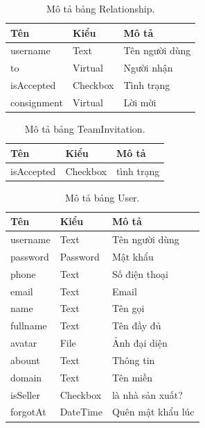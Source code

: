 \documentclass[11pt]{report}
\begin{document}
	
	\begin{table}[h!]
		\begin{center}
			\caption{Mô tả bảng Relationship.}
			\begin{tabularx}{0.6\textwidth}{ |l|l|X| } 
				\hline
				Tên & Kiểu & Mô tả \\
				\hline
				username & Text & Tên người dùng \\
				to & Virtual & Người nhận \\
				isAccepted & Checkbox & Tình trạng \\
				consignment & Virtual & Lời mời \\ 
				\hline
			\end{tabularx}
			\label{table:Relationship}
		\end{center}
	\end{table}
	
	
	\begin{table}[h!]
		\begin{center}
			\caption{Mô tả bảng TeamInvitation.}
			\begin{tabularx}{0.6\textwidth}{ |l|l|X| } 
				\hline
				Tên & Kiểu & Mô tả \\
				\hline
				isAccepted & Checkbox & tình trạng \\
				\hline
			\end{tabularx}
			\label{table:TeamInvitation}
		\end{center}
	\end{table}
	
	\begin{table}[h!]
		\begin{center}
			\caption{Mô tả bảng User.}
			\begin{tabularx}{0.6\textwidth}{ |l|l|X| } 
				\hline
				Tên & Kiểu & Mô tả \\
				\hline
				username & Text & Tên người dùng \\
				password & Password & Mật khẩu \\
				phone & Text & Số điện thoại \\
				email & Text & Email \\
				name & Text & Tên gọi \\
				fullname & Text & Tên đầy đủ \\
				avatar & File & Ảnh đại diện \\
				abount & Text & Thông tin \\
				domain & Text & Tên miền \\
				isSeller & Checkbox & là nhà sản xuất? \\
				forgotAt & DateTime & Quên mật khẩu lúc \\ 
				\hline
			\end{tabularx}
			\label{table:User}
		\end{center}
	\end{table}
	
\end{document}
